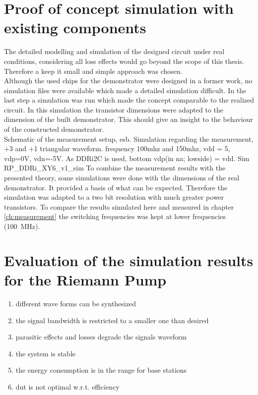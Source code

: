 \section{Proof of concept simulation with existing components}
\label{ch:ProofOfConceptWithExistingComponents}
The detailed modelling and simulation of the designed circuit under real conditions, considering all loss effects would go beyond the scope of this thesis. Therefore a keep it small and simple approach was chosen.\\   
Although the used chips for the demonstrator were designed in a former work, no simulation files were available which made a detailed simulation difficult.
In the last step a simulation was run which made the concept comparable to the realized circuit. 
In this simulation the transistor dimensions were adapted to the dimension of the built demonstrator. 
This should give an insight to the behaviour of the constructed demonstrator.\\
Schematic of the measurement setup, esb.
Simulation regarding the measurement, +3 and +1 triangular waveform.
frequency 100mhz and 150mhz, vdd = 5, vdp=0V, vdn=-5V.
As DDRi2C is used, bottom vdp(in na; lowside) = vdd. 
Sim RP\_DDRi\_XY6\_v1\_sim
To combine the measurement results with the presented theory, some simulations were done with the dimensions of the real demonstrator.
It provided a basis of what can be expected.
Therefore the simulation was adapted to a two bit resolution with much greater power transistors.
To compare the results simulated here and measured in chapter \ref{ch:measurement} the switching frequencies was kept at lower frequencies (\SI{100}{\mega \hertz}).


 


\section{Evaluation of the simulation results for the Riemann Pump}

\begin{enumerate}
	\item different wave forms can be synthesized
	\item the signal bandwidth is restricted to a smaller one than desired
	\item parasitic effects and losses degrade the signals waveform
	\item the system is stable
	\item the energy consumption is in the range for base stations
	\item dut is not optimal w.r.t. efficiency
\end{enumerate}

